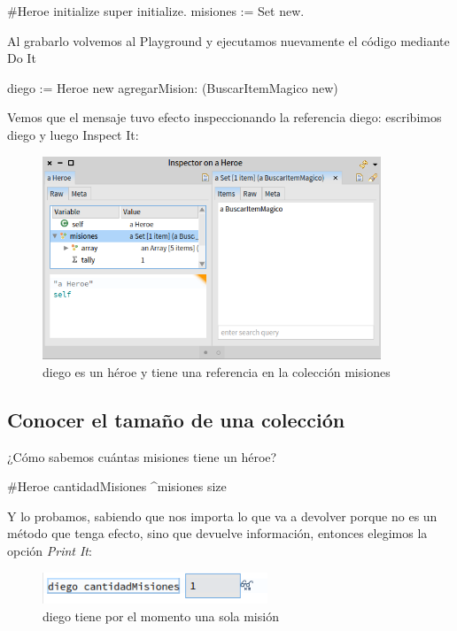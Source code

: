 \documentclass[a4paper,12pt]{book}
\begin{document}
\begin{code}
#Heroe
initialize
	super initialize.
	misiones := Set new.
\end{code}


Al grabarlo volvemos al Playground y ejecutamos nuevamente el código mediante Do It

\begin{code}
diego := Heroe new
  agregarMision: (BuscarItemMagico new)
\end{code}


Vemos que el mensaje tuvo efecto inspeccionando la referencia diego: escribimos diego y luego Inspect It:

\begin{figure}[h!]
    \centering	
    \includegraphics[width=0.9\textwidth]{images/14_coleccion_inicial.png}
    \caption{diego es un héroe y tiene una referencia en la colección misiones}
\end{figure}
\FloatBarrier


\subsection{Conocer el tamaño de una colección}
¿Cómo sabemos cuántas misiones tiene un héroe?

\begin{code}
#Heroe
cantidadMisiones
    ^misiones size
\end{code}
Y lo probamos, sabiendo que nos importa lo que va a devolver porque no es un método que tenga efecto, sino que
devuelve información, entonces elegimos la opción \textit{Print It}:

\begin{figure}[h!]
    \centering	
    \includegraphics[width=0.6\textwidth]{images/15_diego_cantidadMisiones.png}
    \caption{diego tiene por el momento una sola misión}
\end{figure}
\FloatBarrier
\end{document}

